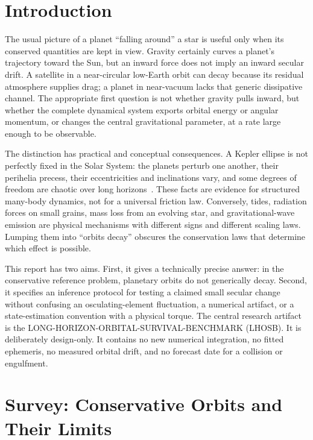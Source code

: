 \documentclass[10pt,conference]{IEEEtran}
\begin{document}
\section{Introduction}
\label{sec:introduction}

The usual picture of a planet ``falling around'' a star is useful only when its conserved quantities are kept in view. Gravity certainly curves a planet's trajectory toward the Sun, but an inward force does not imply an inward secular drift. A satellite in a near-circular low-Earth orbit can decay because its residual atmosphere supplies drag; a planet in near-vacuum lacks that generic dissipative channel. The appropriate first question is not whether gravity pulls inward, but whether the complete dynamical system exports orbital energy or angular momentum, or changes the central gravitational parameter, at a rate large enough to be observable.

The distinction has practical and conceptual consequences. A Kepler ellipse is not perfectly fixed in the Solar System: the planets perturb one another, their perihelia precess, their eccentricities and inclinations vary, and some degrees of freedom are chaotic over long horizons~\cite{murraydermott,laskar1994,laskargastineau2009}. These facts are evidence for structured many-body dynamics, not for a universal friction law. Conversely, tides, radiation forces on small grains, mass loss from an evolving star, and gravitational-wave emission are physical mechanisms with different signs and different scaling laws. Lumping them into ``orbits decay'' obscures the conservation laws that determine which effect is possible.

This report has two aims. First, it gives a technically precise answer: in the conservative reference problem, planetary orbits do not generically decay. Second, it specifies an inference protocol for testing a claimed small secular change without confusing an osculating-element fluctuation, a numerical artifact, or a state-estimation convention with a physical torque. The central research artifact is the LONG-HORIZON-ORBITAL-SURVIVAL-BENCHMARK (LHOSB). It is deliberately design-only. It contains no new numerical integration, no fitted ephemeris, no measured orbital drift, and no forecast date for a collision or engulfment.

\section{Survey: Conservative Orbits and Their Limits}
\label{sec:survey}
\end{document}
